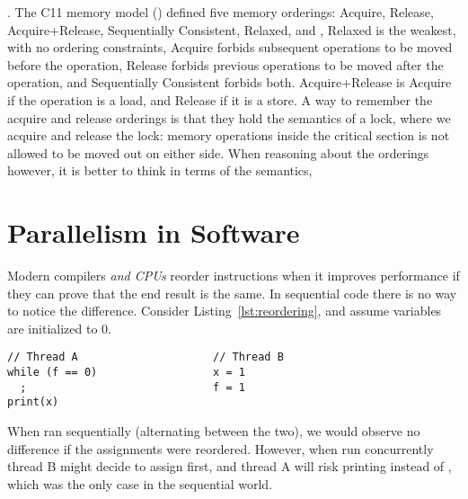 \documentclass[b5paper,twoside]{report}
\begin{document}
.
The C11 memory model () defined five memory orderings:
Acquire, Release, Acquire+Release, Sequentially Consistent, Relaxed, and
,
Relaxed is the weakest, with no ordering constraints,
Acquire forbids subsequent operations to be moved before the operation,
Release forbids previous operations to be moved after the operation,
and Sequentially Consistent forbids both.
Acquire+Release is Acquire if the operation is a load,
and Release if it is a store.
A way to remember the acquire and release orderings is that they
hold the semantics of a lock, where we acquire and release the lock:
memory operations inside the critical section is not allowed to be
moved out on either side.
When reasoning about the orderings however, it is better to think in terms of the semantics,









\section{Parallelism in Software}

Modern compilers \emph{and CPUs} reorder instructions when it improves
performance if they can prove that the end result is the same.
In sequential code there is no way to notice the difference.
Consider Listing~\ref{lst:reordering}, and assume variables
are initialized to 0.
\begin{lstlisting}[caption=Instruction reordering,label=lst:reordering]
// Thread A                     // Thread B
while (f == 0)                  x = 1
  ;                             f = 1
print(x)
\end{lstlisting}
When ran sequentially (alternating between the two), we would observe
no difference if the assignments were reordered. However, when run
concurrently thread B might decide to assign  first,
and thread A will risk printing  instead of ,
which was the only case in the sequential world.
\end{document}
